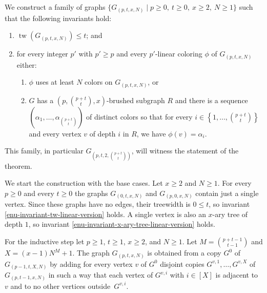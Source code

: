 We construct a family of graphs $\{G_{(p,t,x,N)}\mid p\geq0,\ t\geq0,\ x\geq2,\ N\geq1\}$ such that the following invariants hold:
\begin{enumerate}
\item $\operatorname{tw}(G_{(p,t,x,N)}) \leq t$; and
\label{enu-invariant-tw-linear-version}
\item for every integer $p'$ with $p'\geq p$ and every $p'$-linear coloring $\phi$ of $G_{(p,t,x,N)}$ either:
\label{enu-invariant-general-for-colorings}
\begin{enumerate}
\item $\phi$ uses at least $N$ colors on $G_{(p,t,x,N)}$, or 
\label{enu-invariant-N-colors}
\item 
$G$ has a $\left(p,\binom{p+t}{t},x\right)$-brushed subgraph $R$ and
there is a sequence $\left(\alpha_1,\ldots,\alpha_{\binom{p+t}{t}}\right)$ of distinct colors so that 
for every $i\in\left\{1,\ldots,\binom{p+t}{t}\right\}$ and every vertex $v$ of depth $i$ in $R$, we have $\phi(v)=\alpha_i$.
\label{enu-invariant-x-ary-tree-linear-version}
\end{enumerate}
\end{enumerate}
This family, in particular $G_{\left(p,t,2,\binom{p+t}{t}\right)}$, will witness the statement of the theorem. 


We start the construction with the base cases. 
Let $x\geq2$ and $N\geq1$.
For every $p\geq0$ and every $t\geq0$ the graphs $G_{(0,t,x,N)}$ and $G_{(p,0,x,N)}$ contain just a single vertex.
Since these graphs have no edges, their treewidth is $0\leq t$, so invariant \eqref{enu-invariant-tw-linear-version} holds.
A single vertex is also an $x$-ary tree of depth $1$, so invariant \eqref{enu-invariant-x-ary-tree-linear-version} holds.

For the inductive step let $p\geq1$, $t\geq1$, $x\geq2$, and $N\geq1$. 
Let $M = \binom{p+t-1}{t-1}$ and $X = (x-1)N^M +1$.
The graph $G_{(p,t,x,N)}$ is obtained from a copy $G^0$ of $G_{(p-1,t,X,N)}$
by adding for every vertex $v$ of $G^0$ disjoint copies $G^{v,1},\ldots,G^{v,X}$ of
$G_{(p,t-1,x,N)}$ in such a way that each vertex of $G^{v,i}$ with $i\in[X]$ is adjacent to
$v$ and to no other vertices outside~$G^{v,i}$.


